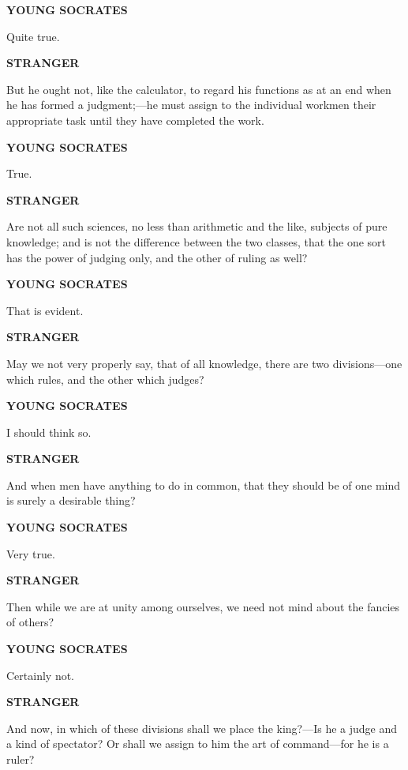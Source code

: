 \documentclass[11pt,letter]{article}
\begin{document}
\par \textbf{YOUNG SOCRATES}
\par   Quite true.

\par \textbf{STRANGER}
\par   But he ought not, like the calculator, to regard his functions as at an end when he has formed a judgment;—he must assign to the individual workmen their appropriate task until they have completed the work.

\par \textbf{YOUNG SOCRATES}
\par   True.

\par \textbf{STRANGER}
\par   Are not all such sciences, no less than arithmetic and the like, subjects of pure knowledge; and is not the difference between the two classes, that the one sort has the power of judging only, and the other of ruling as well?

\par \textbf{YOUNG SOCRATES}
\par   That is evident.

\par \textbf{STRANGER}
\par   May we not very properly say, that of all knowledge, there are two divisions—one which rules, and the other which judges?

\par \textbf{YOUNG SOCRATES}
\par   I should think so.

\par \textbf{STRANGER}
\par   And when men have anything to do in common, that they should be of one mind is surely a desirable thing?

\par \textbf{YOUNG SOCRATES}
\par   Very true.

\par \textbf{STRANGER}
\par   Then while we are at unity among ourselves, we need not mind about the fancies of others?

\par \textbf{YOUNG SOCRATES}
\par   Certainly not.

\par \textbf{STRANGER}
\par   And now, in which of these divisions shall we place the king?—Is he a judge and a kind of spectator? Or shall we assign to him the art of command—for he is a ruler?
\end{document}

